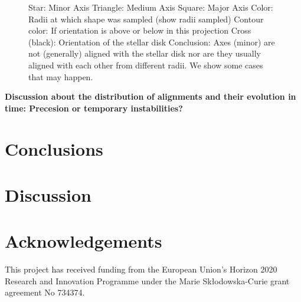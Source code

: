 \documentclass[a4paper,fleqn,usenatbib]{mnras}
\begin{document}
\begin{figure}
  \hfill
  \caption{Star: Minor Axis
    Triangle: Medium Axis
    Square: Major Axis
    Color: Radii at which shape was sampled (show radii sampled)
    Contour color: If orientation is above or below in this projection
    Cross (black): Orientation of the stellar disk
    Conclusion: Axes (minor) are not (generally) aligned with the
    stellar disk nor are they usually aligned with each other from
    different radii. We show some cases that may happen.} 
  \label{fig:alignment}
\end{figure}

\textbf{Discussion about the distribution of alignments and their
  evolution in time: Precesion or temporary instabilities?} 

\section{Conclusions}

\section{Discussion}

\section*{Acknowledgements}
This project has received funding from the European Union’s Horizon
2020 Research and Innovation Programme under the Marie
Sk\l{}odowska-Curie grant agreement No 734374. 

 
 
\end{document}
